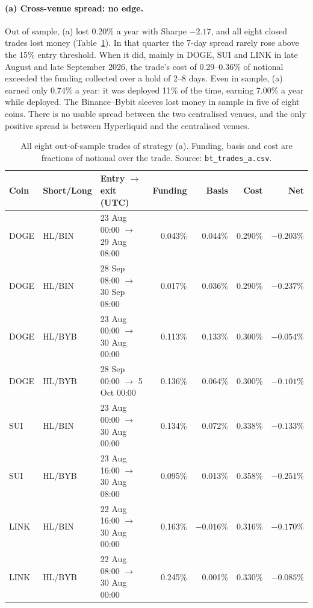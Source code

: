\documentclass[11pt,a4paper]{article}
\begin{document}
\paragraph{(a) Cross-venue spread: no edge.}
Out of sample, (a) lost 0.20\% a year with Sharpe $-2.17$, and all eight closed trades lost money (Table~\ref{tab:oos_a}).
In that quarter the 7-day spread rarely rose above the 15\% entry threshold. When it did, mainly in DOGE, SUI and LINK in late August and late September 2026, the trade's cost of 0.29--0.36\% of notional exceeded the funding collected over a hold of 2--8 days.
Even in sample, (a) earned only 0.74\% a year: it was deployed 11\% of the time, earning 7.00\% a year while deployed.
The Binance--Bybit sleeves lost money in sample in five of eight coins. There is no usable spread between the two centralised venues, and the only positive spread is between Hyperliquid and the centralised venues.

\begin{table}[H]
\centering\small
\caption{All eight out-of-sample trades of strategy (a). Funding, basis and cost are fractions of notional over the trade. Source: \texttt{bt\_trades\_a.csv}.}
\label{tab:oos_a}
\begin{tabular}{lllrrrr}
\toprule
Coin & Short/Long & Entry $\to$ exit (UTC) & Funding & Basis & Cost & Net\\
\midrule
DOGE & HL/BIN & 23 Aug 00:00 $\to$ 29 Aug 08:00 & 0.043\% & 0.044\% & 0.290\% & $-0.203\%$\\
DOGE & HL/BIN & 28 Sep 08:00 $\to$ 30 Sep 08:00 & 0.017\% & 0.036\% & 0.290\% & $-0.237\%$\\
DOGE & HL/BYB & 23 Aug 00:00 $\to$ 30 Aug 00:00 & 0.113\% & 0.133\% & 0.300\% & $-0.054\%$\\
DOGE & HL/BYB & 28 Sep 00:00 $\to$ 5 Oct 00:00 & 0.136\% & 0.064\% & 0.300\% & $-0.101\%$\\
SUI  & HL/BIN & 23 Aug 00:00 $\to$ 30 Aug 00:00 & 0.134\% & 0.072\% & 0.338\% & $-0.133\%$\\
SUI  & HL/BYB & 23 Aug 16:00 $\to$ 30 Aug 08:00 & 0.095\% & 0.013\% & 0.358\% & $-0.251\%$\\
LINK & HL/BIN & 22 Aug 16:00 $\to$ 30 Aug 00:00 & 0.163\% & $-0.016\%$ & 0.316\% & $-0.170\%$\\
LINK & HL/BYB & 22 Aug 08:00 $\to$ 30 Aug 00:00 & 0.245\% & 0.001\% & 0.330\% & $-0.085\%$\\
\bottomrule
\end{tabular}
\end{table}
\end{document}

